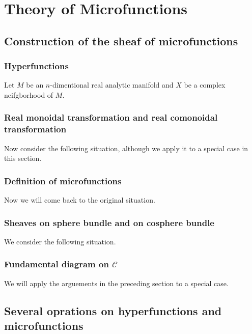 \chapter{Theory of Microfunctions}

\section{Construction of the sheaf of microfunctions}

\subsection{Hyperfunctions}

Let $M$ be an $n$-dimentional real analytic manifold 
and $X$ be a complex neifgborhood of $M$. 




\subsection{Real monoidal transformation and real comonoidal transformation}

Now consider the following situation, although we apply it 
to a special case in this section.




\subsection{Definition of microfunctions}

Now we will come back to the original situation. 




\subsection{Sheaves on sphere bundle and on cosphere bundle}

We consider the following situation.



\subsection{Fundamental diagram on $\mathscr{C}$}

We will apply the arguements in the preceding section 
to a special case.

\section{Several oprations on hyperfunctions and microfunctions}
